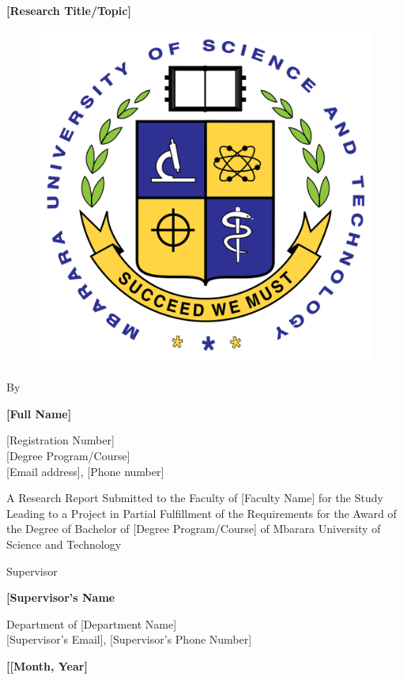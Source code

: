 
\thispagestyle{empty}%


\begin{center}
{\bf\LARGE [Research Title/Topic]}
\par\vspace{3mm}
\begin{figure}[H]
    \centering
    \includegraphics[width=.15\linewidth]{images/MUST-logo.png}
    \label{fig:2019cases}
\end{figure}
\par\vspace{2mm}

\par By

\par\vspace{4mm}

\par{\bf [Full Name]}

[Registration Number]\\

[Degree Program/Course]\\

[Email address], [Phone number]

\par\vspace{5mm}
%
A Research Report Submitted to the Faculty of [Faculty Name] for the Study Leading to a Project in  Partial Fulfillment of the Requirements for the Award of the Degree of Bachelor of [Degree Program/Course]
of Mbarara University of Science and Technology

\par\vspace{3mm}

Supervisor\\

\par{\bf [Supervisor's Name}

Department of [Department Name]\\

[Supervisor's Email], [Supervisor's Phone Number]


\par\vspace{16mm}
\par {\bf [[Month, Year]}

\end{center}



